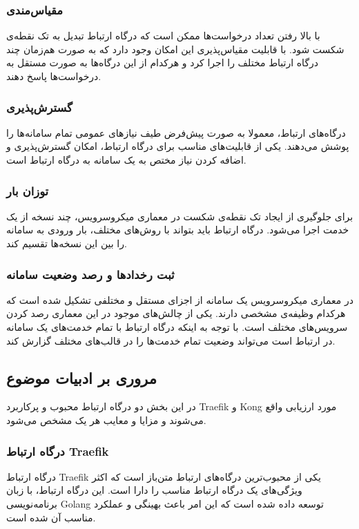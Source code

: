 \subsubsection{مقیاس‌مندی}
با بالا رفتن تعداد درخواست‌ها ممکن است که درگاه ارتباط تبدیل به تک نقطه‌ی شکست شود. با قابلیت مقیاس‌پذیری این امکان وجود دارد که به صورت هم‌زمان چند درگاه ارتباط مختلف را اجرا کرد و هر‌کدام از این درگاه‌ها به صورت مستقل به درخواست‌ها پاسخ دهند.

\subsubsection{گسترش‌پذیری}
درگاه‌های ارتباط، معمولا به صورت پیش‌فرض طیف نیازهای عمومی تمام سامانه‌ها را پوشش می‌دهند. یکی از قابلیت‌های مناسب برای درگاه ارتباط، امکان گسترش‌پذیری و اضافه کردن نیاز مختص به یک سامانه به درگاه ارتباط است.

\subsubsection{توزان بار}
برای جلوگیری از ایجاد تک نقطه‌ی شکست در معماری میکروسرویس، چند نسخه از یک خدمت اجرا می‌شود. درگاه ارتباط باید بتواند با روش‌های مختلف، بار ورودی به سامانه را بین این نسخه‌ها تقسیم کند.

\subsubsection{ثبت رخداد‌ها و رصد وضعیت سامانه}
در معماری میکروسرویس یک سامانه از اجزای مستقل و مختلفی تشکیل شده است که هر‌کدام وظیفه‌ی مشخصی دارند. یکی از چالش‌های موجود در این معماری رصد کردن سرویس‌های مختلف است. با توجه به اینکه درگاه ارتباط با تمام خدمت‌های یک سامانه در ارتباط است می‌تواند وضعیت تمام خدمت‌ها را در قالب‌های مختلف گزارش کند.


\subsection{مروری بر ادبیات موضوع}\label{subsec:sources_literature}
در این بخش دو درگاه ارتباط محبوب و پرکاربرد Traefik و Kong مورد ارزیابی واقع می‌شوند و مزایا و معایب هر یک مشخص می‌شود.

\subsubsection{درگاه ارتباط Traefik}
درگاه ارتباط Traefik یکی از محبوب‌ترین درگاه‌های ارتباط متن‌باز است که اکثر ویژگی‌های یک درگاه ارتباط مناسب را دارا است. این درگاه ارتباط، با زبان برنامه‌نویسی Golang توسعه داده شده است که این امر باعث بهینگی و عملکرد مناسب آن شده است.

